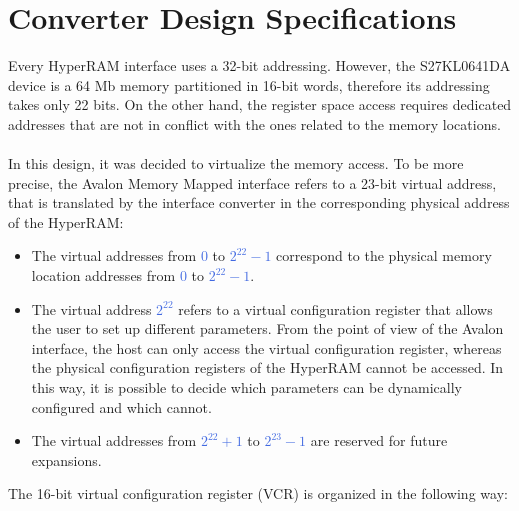 \documentclass[10pt, english, a4paper, titlepage, oneside]{book}
\begin{document}
\section{Converter Design Specifications} \label{Converter Design Specifications}
\vspace{2mm}
Every HyperRAM interface uses a 32-bit addressing. However, the S27KL0641DA device is a 64 Mb memory partitioned in 16-bit words, therefore its addressing takes only 22 bits. On the other hand, the register space access requires dedicated addresses that are not in conflict with the ones related to the memory locations. \\ \\
In this design, it was decided to virtualize the memory access. To be more precise, the Avalon Memory Mapped interface refers to a 23-bit virtual address, that is translated by the interface converter in the corresponding physical address of the HyperRAM:
\vspace{2mm}
\begin{itemize}
    \item The virtual addresses from \textcolor{RoyalBlue}{0} to \textcolor{RoyalBlue}{$2^{22}-1$} correspond to the physical memory location addresses from \textcolor{RoyalBlue}{0} to \textcolor{RoyalBlue}{$2^{22}-1$}.
    \vspace{1mm}
    \item The virtual address \textcolor{RoyalBlue}{$2^{22}$} refers to a virtual configuration register that allows the user to set up different parameters. From the point of view of the Avalon interface, the host can only access the virtual configuration register, whereas the physical configuration registers of the HyperRAM cannot be accessed. In this way, it is possible to decide which parameters can be dynamically configured and which cannot.
    \vspace{1mm}
    \item The virtual addresses from \textcolor{RoyalBlue}{$2^{22} + 1$} to \textcolor{RoyalBlue}{$2^{23} - 1$} are reserved for future expansions.
\end{itemize}
\vspace{4mm}
The 16-bit virtual configuration register (\acrshort{VCR}) is organized in the following way:
\vspace{4mm}
\renewcommand{\arraystretch}{1.5}
\end{document}

